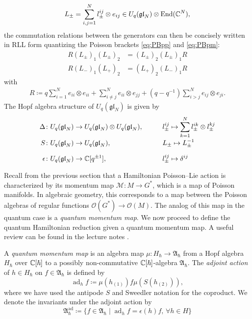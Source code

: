 \begin{example}
\begin{enumerate}[label=(\roman*)]
		\begin{equation}
			L_\pm = \sum_{i,j=1}^N l_\pm^{ij} \otimes e_{ij} \in U_q(\mathfrak{gl}_N) \otimes \operatorname{End}(\mathbb{C}^N),
		\end{equation}
		the commutation relations between the generators can then be concisely written in RLL form quantizing the Poisson brackets \eqref{eq:PBpp} and \eqref{eq:PBpm}:
		\begin{align}
			R (L_\pm)_1 (L_\pm)_2 &= (L_\pm)_2 (L_\pm)_1 R \\
			R (L_-)_1 (L_+)_2 &= (L_+)_2 (L_-)_1 R
		\end{align}
		with
		\begin{align}
			R \coloneq q \sum_{i=1}^N e_{ii} \otimes e_{ii} + \sum_{i \neq j}^N e_{ii} \otimes e_{jj} + (q-q^{-1}) \sum_{i>j}^N e_{ij} \otimes e_{ji}.
		\end{align}
		The Hopf algebra structure of $U_q(\mathfrak{gl}_N)$ is given by
		\begin{align}
			\Delta &\colon U_q(\mathfrak{gl}_N) \to U_q(\mathfrak{gl}_N) \otimes U_q(\mathfrak{gl}_N), \qquad &&l_\pm^{ij} \mapsto \sum_{k=1}^N l_\pm^{ik} \otimes l_\pm^{kj} \\[-2pt]
			S &\colon U_q(\mathfrak{gl}_N) \to U_q(\mathfrak{gl}_N), \qquad &&L_\pm \mapsto L_\pm^{-1} \\[6pt]
			\epsilon &\colon U_q(\mathfrak{gl}_N) \to \mathbb{C}[q^{\pm 1}], \qquad &&l_\pm^{ij} \mapsto \delta^{ij}
		\end{align}
	\end{enumerate}
\end{example}

Recall from the previous section that a Hamiltonian Poisson--Lie action is characterized by its momentum map $\mathcal{M} \colon M \to G^*$, which is a map of Poisson manifolds. In algebraic geometry, this corresponds to a map between the Poisson algebras of regular functions $\mathcal{O}(G^*) \to \mathcal{O}(M)$. The analog of this map in the quantum case is a \emph{quantum momentum map}. We now proceed to define the quantum Hamiltonian reduction given a quantum momentum map. A useful review can be found in the lecture notes \cite{etingof_lectures_2009}.

\begin{definition}
	A \emph{quantum momentum map} is an algebra map $\mu \colon H_\hbar \to \mathfrak{A}_\hbar$ from a Hopf algebra $H_\hbar$ over $\mathbb{C}[\hbar]$ to a possibly non-commutative $\mathbb{C}[\hbar]$-algebra $\mathfrak{A}_\hbar$. The \emph{adjoint action} of $h \in H_\hbar$ on $f \in \mathfrak{A}_\hbar$ is defined by
	\begin{equation}
		\operatorname{ad}_h f \coloneq \mu(h_{(1)}) f \mu(S(h_{(2)})),
	\end{equation}
	where we have used the antipode $S$ and Sweedler notation for the coproduct. We denote the invariants under the adjoint action by
	\begin{equation}
		\mathfrak{A}_\hbar^{\operatorname{ad}} \coloneq \{ f \in \mathfrak{A}_\hbar \mid \operatorname{ad}_h f = \epsilon(h) f, \, \forall h \in H \}
	\end{equation}
\end{definition}

